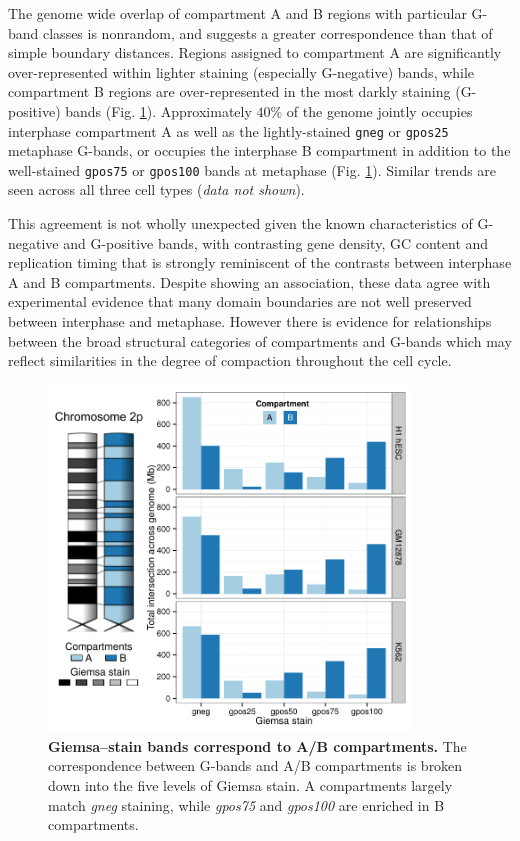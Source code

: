 \documentclass[a4paper,11pt,oneside]{book}
\begin{document}
The genome wide overlap of compartment A and B regions with particular G-band classes is nonrandom, and suggests a greater correspondence than that of simple boundary distances. Regions assigned to compartment A are significantly over-represented within lighter staining (especially G-negative) bands, while compartment B regions are over-represented in the most darkly staining (G-positive) bands (Fig. \ref{fig:gbands}). Approximately $40\%$ of the genome jointly occupies interphase compartment A as well as the lightly-stained \texttt{gneg} or \texttt{gpos25} metaphase G-bands, or occupies the interphase B compartment in addition to the well-stained \texttt{gpos75} or \texttt{gpos100} bands at metaphase (Fig. \ref{fig:gbands}). Similar trends are seen across all three cell types (\emph{data not shown}). 

This agreement is not wholly unexpected given the known characteristics of G-negative and G-positive bands, with contrasting gene density, GC content and replication timing\cite{Furey2003} that is strongly reminiscent of the contrasts between interphase A and B compartments.\cite{Lieberman2009} Despite showing an association, these data agree with experimental evidence that many domain boundaries are not well preserved between interphase and metaphase. However there is evidence for relationships between the broad structural categories of compartments and G-bands which may reflect similarities in the degree of compaction throughout the cell cycle.

\begin{figure}
\begin{center} 
\includegraphics[width=3.8in]{gbands.pdf}
\captionsetup{width=\textwidth}
\caption[ Giemsa--stain bands correspond to A/B compartments.]{ {\bf Giemsa--stain bands correspond to A/B compartments.}
The correspondence between G-bands and A/B compartments is broken down into the five levels of Giemsa stain. A compartments largely match \emph{gneg} staining, while \emph{gpos75} and \emph{gpos100} are enriched in B compartments.
}\label{fig:gbands}
\end{center}
\end{figure} 
\end{document}
